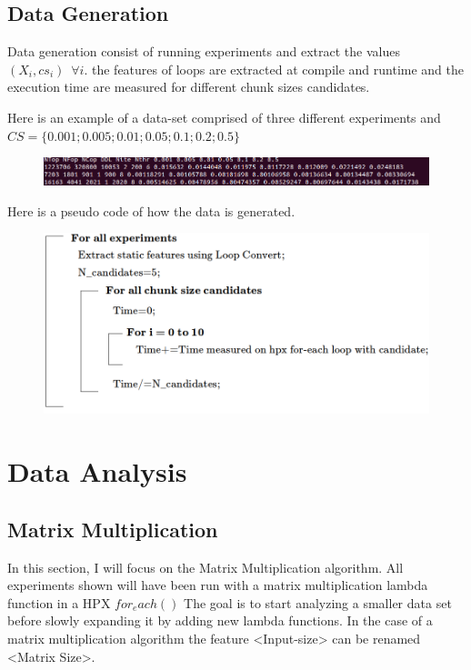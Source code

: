 \documentclass[12pt]{article}
\begin{document}
\subsection{Data Generation}
Data generation consist of running experiments and extract the values $(X_i,cs_i) \, \, \, \forall i$. the features of loops are extracted at compile and runtime and the execution time are measured for different chunk sizes candidates. 

Here is an example of a data-set comprised of three different experiments and $CS=\{0.001;0.005;0.01;0.05;0.1;0.2;0.5\}$

\begin{figure}[h]
	\centering
	\includegraphics[scale=0.45]{images/screenshot_data.png}
\end{figure}


Here is a pseudo code of how the data is generated.

\begin{figure}[h]
	\centering
	\includegraphics[scale=0.49]{images/pseudo-code.png}
\end{figure}
\section{Data Analysis}

\subsection{Matrix Multiplication}
In this section, I will focus on the Matrix Multiplication algorithm. All experiments shown will have been run with a matrix multiplication lambda function in a HPX $for_each()$ The goal is to start analyzing a smaller data set before slowly expanding it by adding new lambda functions. In the case of a matrix multiplication algorithm the feature <Input-size> can be renamed <Matrix Size>.
\end{document}
